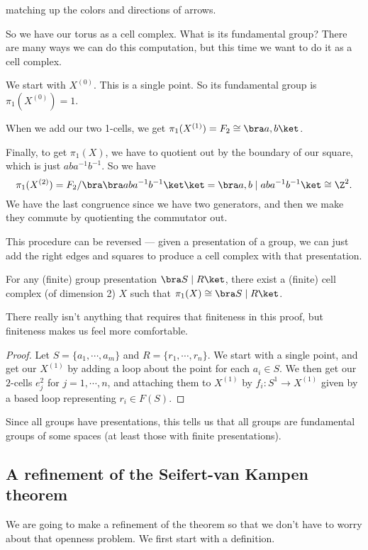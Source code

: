 \documentclass[a4paper]{article}
\begin{document}
\begin{eg}
\begin{center}
  \end{center}
  matching up the colors and directions of arrows.

  So we have our torus as a cell complex. What is its fundamental group? There are many ways we can do this computation, but this time we want to do it as a cell complex.

  We start with $X^{(0)}$. This is a single point. So its fundamental group is $\pi_1(X^{(0)}) = 1$.

  When we add our two 1-cells, we get $\pi_1(X^{(1)}) = F_2 \cong \bra a, b\ket$.

  Finally, to get $\pi_1(X)$, we have to quotient out by the boundary of our square, which is just $aba^{-1}b^{-1}$. So we have
  \[
    \pi_1(X^{(2)}) = F_2/\bra \bra aba^{-1}b^{-1}\ket\ket = \bra a, b \mid aba^{-1}b^{-1}\ket \cong \Z^2.
  \]
  We have the last congruence since we have two generators, and then we make they commute by quotienting the commutator out.
\end{eg}
This procedure can be reversed --- given a presentation of a group, we can just add the right edges and squares to produce a cell complex with that presentation.

\begin{cor}
  For any (finite) group presentation $\bra S\mid R\ket$, there exist a (finite) cell complex (of dimension 2) $X$ such that $\pi_1(X) \cong \bra S\mid R \ket$.
\end{cor}
There really isn't anything that requires that finiteness in this proof, but finiteness makes us feel more comfortable.

\begin{proof}
  Let $S = \{a_1, \cdots, a_m\}$ and $R = \{r_1, \cdots, r_n\}$. We start with a single point, and get our $X^{(1)}$ by adding a loop about the point for each $a_i \in S$. We then get our $2$-cells $e_j^2$ for $j = 1, \cdots, n$, and attaching them to $X^{(1)}$ by $f_i: S^1 \to X^{(1)}$ given by a based loop representing $r_i \in F(S)$.
\end{proof}
Since all groups have presentations, this tells us that all groups are fundamental groups of some spaces (at least those with finite presentations).

\subsection{A refinement of the Seifert-van Kampen theorem}
We are going to make a refinement of the theorem so that we don't have to worry about that openness problem. We first start with a definition.
\end{document}
